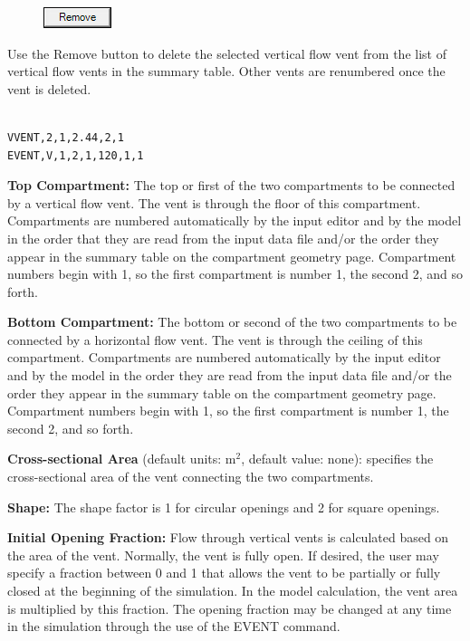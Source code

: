 \begin{figure}
  \includegraphics[width=0.781in]{FIGURES/Input_File/Remove_Button}
\end{figure}

Use the Remove button to delete the selected vertical flow vent from the list of vertical flow vents in the summary table.  Other vents are renumbered once the vent is deleted. \\~ \\

\begin{lstlisting}
VVENT,2,1,2.44,2,1
EVENT,V,1,2,1,120,1,1
\end{lstlisting}

\textbf{Top Compartment:} The top or first of the two compartments to be connected by a vertical flow vent. The vent is through the floor of this compartment.  Compartments are numbered automatically by the input editor and by the model in the order that they are read from the input data file and/or the order they appear in the summary table on the compartment geometry page. Compartment numbers begin with 1, so the first compartment is number 1, the second 2, and so forth.

\textbf{Bottom Compartment:} The bottom or second of the two compartments to be connected by a horizontal flow vent. The vent is through the ceiling of this compartment. Compartments are numbered automatically by the input editor and by the model in the order they are read from the input data file and/or the order they appear in the summary table on the compartment geometry page. Compartment numbers begin with 1, so the first compartment is number 1, the second 2, and so forth.

\textbf{Cross-sectional Area} (default units: m$^2$, default value: none): specifies the cross-sectional area of the vent connecting the two compartments.

\textbf{Shape:} The shape factor is 1 for circular openings and 2 for square openings.

\textbf{Initial Opening Fraction:} Flow through vertical vents is calculated based on the area of the vent.  Normally, the vent is fully open.  If desired, the user may specify a fraction between 0 and 1 that allows the vent to be partially or fully closed at the beginning of the simulation.  In the model calculation, the vent area is multiplied by this fraction.  The opening fraction may be changed at any time in the simulation through the use of the EVENT command.

